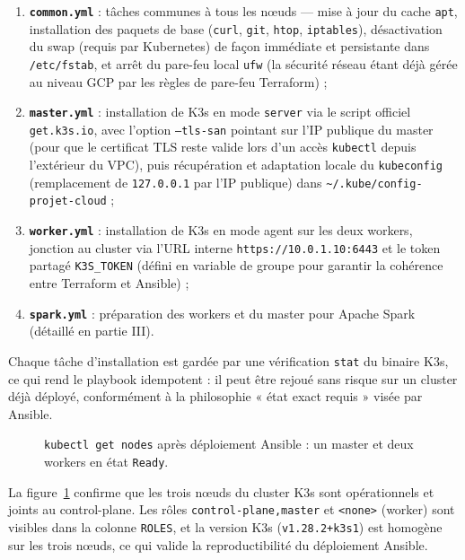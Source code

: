 \documentclass{name}
\begin{document}
\begin{enumerate}
    \item \textbf{\texttt{common.yml}} : tâches communes à tous les nœuds — mise à jour du cache \texttt{apt}, installation des paquets de base (\texttt{curl}, \texttt{git}, \texttt{htop}, \texttt{iptables}), désactivation du swap (requis par Kubernetes) de façon immédiate et persistante dans \texttt{/etc/fstab}, et arrêt du pare-feu local \texttt{ufw} (la sécurité réseau étant déjà gérée au niveau GCP par les règles de pare-feu Terraform) ;
    \item \textbf{\texttt{master.yml}} : installation de K3s en mode \texttt{server} via le script officiel \texttt{get.k3s.io}, avec l'option \texttt{--tls-san} pointant sur l'IP publique du master (pour que le certificat TLS reste valide lors d'un accès \texttt{kubectl} depuis l'extérieur du VPC), puis récupération et adaptation locale du \texttt{kubeconfig} (remplacement de \texttt{127.0.0.1} par l'IP publique) dans \texttt{\textasciitilde/.kube/config-projet-cloud} ;
    \item \textbf{\texttt{worker.yml}} : installation de K3s en mode agent sur les deux workers, jonction au cluster via l'URL interne \texttt{https://10.0.1.10:6443} et le token partagé \texttt{K3S\_TOKEN} (défini en variable de groupe pour garantir la cohérence entre Terraform et Ansible) ;
    \item \textbf{\texttt{spark.yml}} : préparation des workers et du master pour Apache Spark (détaillé en partie III).
\end{enumerate}

Chaque tâche d'installation est gardée par une vérification \texttt{stat} du binaire K3s, ce qui rend le playbook idempotent : il peut être rejoué sans risque sur un cluster déjà déployé, conformément à la philosophie « état exact requis » visée par Ansible.

\begin{figure}[H]
    \centering
    \fbox{\rule{0.9\textwidth}{0pt}\rule{0pt}{4cm}}
    \caption{\texttt{kubectl get nodes} après déploiement Ansible : un master et deux workers en état \texttt{Ready}.}
    \label{fig:get-nodes}
\end{figure}

La figure~\ref{fig:get-nodes} confirme que les trois nœuds du cluster K3s sont opérationnels et joints au control-plane. Les rôles \texttt{control-plane,master} et \texttt{<none>} (worker) sont visibles dans la colonne \texttt{ROLES}, et la version K3s (\texttt{v1.28.2+k3s1}) est homogène sur les trois nœuds, ce qui valide la reproductibilité du déploiement Ansible.
\end{document}
